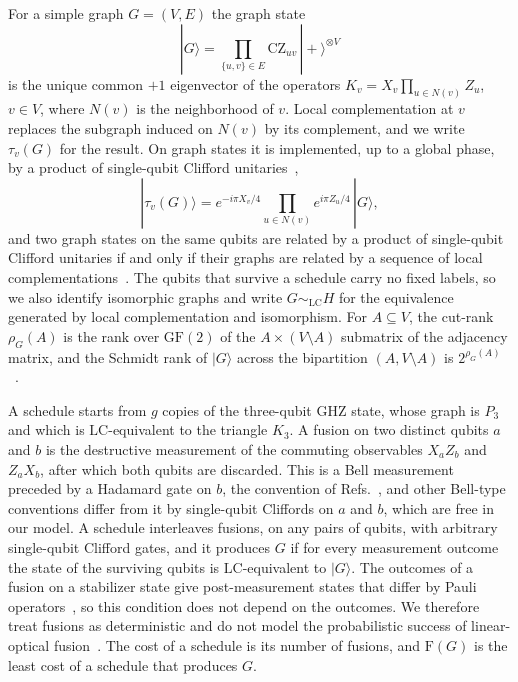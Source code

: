\documentclass[aps,pra,onecolumn,superscriptaddress,nofootinbib,longbibliography]{revtex4-2}
\theoremstyle{plain}
\theoremstyle{remark}
\newcommand{\F}{\mathrm{F}}
\newcommand{\LC}{\mathrm{LC}}
\newcommand{\nbr}{N}
\begin{document}
For a simple graph $G=(V,E)$ the graph state
\[
  |G\rangle=\prod_{\{u,v\}\in E}\mathrm{CZ}_{uv}\,|{+}\rangle^{\otimes V}
\]
is the unique common $+1$ eigenvector of the operators $K_v=X_v\prod_{u\in\nbr(v)}Z_u$, $v\in V$, where
$\nbr(v)$ is the neighborhood of $v$. Local complementation at $v$ replaces the subgraph induced on
$\nbr(v)$ by its complement, and we write $\tau_v(G)$ for the result. On graph states it is implemented,
up to a global phase, by a product of single-qubit Clifford unitaries~\cite{VandenNest2004graphical},
\begin{equation}\label{eq:lc}
  |\tau_v(G)\rangle = e^{-i\pi X_v/4}\prod_{u\in\nbr(v)}e^{i\pi Z_u/4}\,|G\rangle,
\end{equation}
and two graph states on the same qubits are related by a product of single-qubit Clifford unitaries if
and only if their graphs are related by a sequence of local complementations~\cite{VandenNest2004graphical}.
The qubits that survive a schedule carry no fixed labels, so we also identify isomorphic graphs and write
$G\sim_{\LC}H$ for the equivalence generated by local complementation and isomorphism. For
$A\subseteq V$, the cut-rank $\rho_G(A)$ is the rank over $\mathrm{GF}(2)$ of the $A\times(V\setminus A)$
submatrix of the adjacency matrix, and the Schmidt rank of $|G\rangle$ across the bipartition
$(A,V\setminus A)$ is $2^{\rho_G(A)}$~\cite{Hein2004multiparty}.

A schedule starts from $g$ copies of the three-qubit GHZ state, whose graph is $P_3$ and which is
$\LC$-equivalent to the triangle $K_3$. A fusion on two distinct qubits $a$ and $b$ is the destructive
measurement of the commuting observables $X_aZ_b$ and $Z_aX_b$, after which both qubits are discarded.
This is a Bell measurement preceded by a Hadamard gate on $b$, the convention of
Refs.~\cite{Lee2023graph,Lobl2025transforming}, and other Bell-type conventions differ from it by
single-qubit Cliffords on $a$ and $b$, which are free in our model. A schedule interleaves fusions, on any
pairs of qubits, with arbitrary single-qubit Clifford gates, and it produces $G$ if for every measurement
outcome the state of the surviving qubits is $\LC$-equivalent to $|G\rangle$. The outcomes of a fusion on a
stabilizer state give post-measurement states that differ by Pauli
operators~\cite{Lee2023graph,Lobl2025transforming}, so this condition does not depend on the outcomes. We
therefore treat fusions as deterministic and do not model the probabilistic success of linear-optical
fusion~\cite{Browne2005resource}. The cost of a schedule is its number
of fusions, and $\F(G)$ is the least cost of a schedule that produces $G$.
\end{document}
